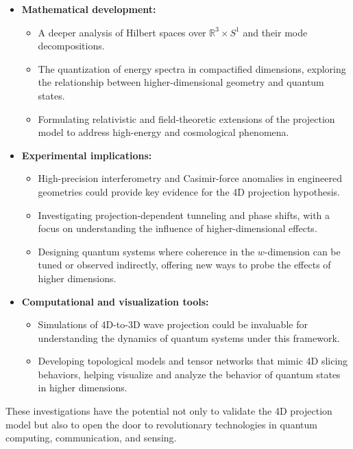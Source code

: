 \documentclass[12pt]{article}
\begin{document}
\begin{itemize}
    \item \textbf{Mathematical development:}
    \begin{itemize}
        \item A deeper analysis of Hilbert spaces over \( \mathbb{R}^3 \times S^1 \) and their mode decompositions.
        \item The quantization of energy spectra in compactified dimensions, exploring the relationship between higher-dimensional geometry and quantum states.
        \item Formulating relativistic and field-theoretic extensions of the projection model to address high-energy and cosmological phenomena.
    \end{itemize}

    \item \textbf{Experimental implications:}
    \begin{itemize}
        \item High-precision interferometry and Casimir-force anomalies in engineered geometries could provide key evidence for the 4D projection hypothesis.
        \item Investigating projection-dependent tunneling and phase shifts, with a focus on understanding the influence of higher-dimensional effects.
        \item Designing quantum systems where coherence in the \( w \)-dimension can be tuned or observed indirectly, offering new ways to probe the effects of higher dimensions.
    \end{itemize}

    \item \textbf{Computational and visualization tools:}
    \begin{itemize}
        \item Simulations of 4D-to-3D wave projection could be invaluable for understanding the dynamics of quantum systems under this framework.
        \item Developing topological models and tensor networks that mimic 4D slicing behaviors, helping visualize and analyze the behavior of quantum states in higher dimensions.
    \end{itemize}
\end{itemize}

These investigations have the potential not only to validate the 4D projection model but also to open the door to revolutionary technologies in quantum computing, communication, and sensing.
\end{document}
